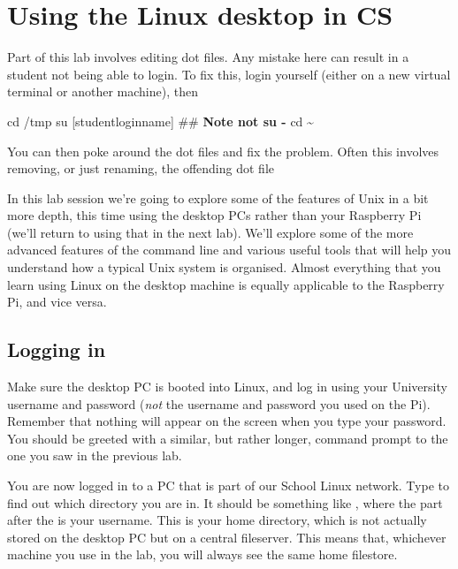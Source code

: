 \chapter{Using the Linux desktop in CS}

\minitoc


\begin{demonote}
  Part of this lab involves editing dot files. Any mistake here can result in a student not being able to login. To fix this, login yourself (either on a new virtual terminal or another machine), then
  \begin{ttoutenv}
    cd /tmp
    su [studentloginname]  ## \textbf{Note not su -}
    cd \textasciitilde
  \end{ttoutenv}
  You can then poke around the dot files and fix the problem. Often this involves removing, or just renaming, the offending dot file

\end{demonote}

In this lab session we're going to explore some of the features of Unix in a bit more depth, this time using the desktop PCs rather than your Raspberry Pi (we'll return to using that in the next lab). We'll explore some of the more advanced features of the command line and various useful tools that will help you understand how a typical Unix system is organised. Almost everything that you learn using Linux on the desktop machine is equally applicable to the Raspberry Pi, and vice versa. 

\section{Logging in}

 Make sure the desktop PC is booted into Linux, and log in using your University username and password (\emph{not} the username and password you used on the Pi). Remember that nothing will appear on the screen when you type your password. You should be greeted with a similar, but rather longer, command prompt to the one you saw in the previous lab.

 You are now logged in to a PC that is part of our School Linux network. Type  to find out which directory you are in. It should be something like , where the part after the \ttout{/} is your username. This is your home directory, which is not actually stored on the desktop PC but on a central fileserver. This means that, whichever machine you use in the lab, you will always see the same home filestore. 

